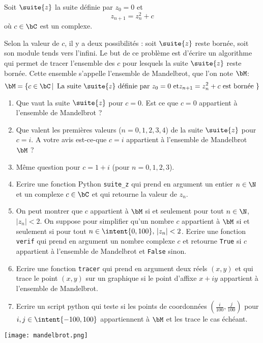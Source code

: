 \documentclass[a4paper, 11pt,reqno]{article}
\begin{document}
\begin{exercice}
Soit $\suite{z}$ la suite définie par $z_0=0$ et 
$$z_{n+1} =z_n^2 +c$$
où $c\in \bC$ est un complexe. 

Selon la valeur de $c$, il y a deux possibilités : soit $\suite{z}$ reste bornée, soit son module tends vers l'infini. Le but de ce problème est d'écrire un algorithme qui permet de tracer l'ensemble des $c$ pour lesquels la suite $\suite{z}$ reste bornée. Cette ensemble s'appelle l'ensemble de Mandelbrot, que l'on note $\bM$:
$$\bM =  \{ c\in \bC\, |\,  \text{ La suite $\suite{z}$ définie par $z_0=0$ et$z_{n+1} =z_n^2 +c$ est bornée } \} $$
\begin{enumerate}
\item Que vaut la suite $\suite{z}$ pour $c=0$. Est ce que $c=0$ appartient à l'ensemble de Mandelbrot ?

\item Que valent les premières valeurs ($n=0,1,2,3,4$) de la suite $\suite{z}$ pour $c=i$.  A votre avis est-ce-que $c=i$ appartient à l'ensemble de Mandelbrot $\bM$ ? 
\item Même question pour $c=1+i$ (pour $n=0,1,2,3$).
\item Ecrire une fonction Python \texttt{suite\_z} qui prend en argument un entier $n\in \N$ et un complexe $c\in \bC$ et qui retourne la valeur de $z_n$.
\item On peut montrer que $c$ appartient à $\bM$ si et seulement pour tout $n\in \N$,  $|z_n|<2$.
On suppose pour simplifier qu'un nombre $c$ appartient  à $\bM$ si et seulement si  pour tout $n\in \intent{0,100},   \, |z_n|<2$.
Ecrire une fonction \texttt{verif} qui prend en argument un nombre complexe $c$ et retourne \texttt{True} si $c$ appartient à l'ensemble de Mandelbrot et \texttt{False} sinon. 
\item Ecrire une fonction \texttt{tracer} qui prend en argument deux réels $(x,y)$ et qui trace le point $(x,y)$ sur un graphique si le point d'affixe $x+iy$ appartient à l'ensemble de Mandelbrot. 
\item Ecrire un script python qui teste  si les points de coordonnées $\left( \frac{i}{100}, \frac{j}{100}\right)$ pour $i, j\in \intent{-100,100}$ appartiennent  à $\bM$ et les trace le cas échéant. 
\end{enumerate}
\begin{center}
\texttt{[image: mandelbrot.png]}
\end{center}

\end{exercice}
\end{document}
